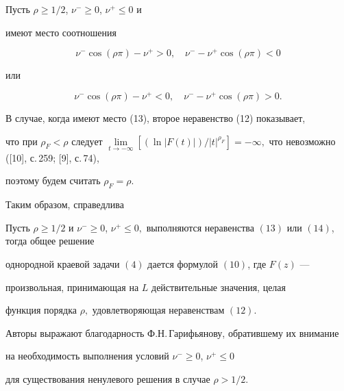 Пусть $\rho\geq 1/2$, $\nu^{-}\geq 0$, $\nu^{+}\leq 0$ и


имеют место соотношения


\begin{equation}


\nu^{-}\cos(\rho\pi)-\nu^{+} > 0,\quad \nu^{-}-\nu^{+}\cos(\rho\pi) < 0


\end{equation}


или


\begin{equation}


\nu^{-}\cos(\rho\pi)-\nu^{+} < 0,\quad\nu^{-}-\nu^{+}\cos(\rho\pi) > 0.


\end{equation}


В случае, когда имеют место (13), второе неравенство (12) показывает,


что при $\rho_{F} <\rho$ следует $\lim\limits_{t\to -\infty}[(\ln|F(t)|)


/|t|^{\rho_{F}}]=-\infty,$ что невозможно ([10], с.\,259; [9], с.\,74),


поэтому будем считать $\rho_{F}=\rho.$





Таким образом, справедлива





\begin{thm}


Пусть $\rho\geq 1/2$ и $\nu^{-}\geq 0$, $\nu^{+}


\leq 0,$ выполняются неравенства $(13)$ или $(14)$, тогда общее решение


однородной краевой задачи $(4)$ дается формулой $(10)$, где $F(z)$ ---


произвольная, принимающая на $L$ действительные значения, целая


функция порядка $\rho,$ удовлетворяющая неравенствам $(12)$.


\end{thm}





Авторы выражают благодарность Ф.Н.\,Гарифьянову, обратившему их внимание


на необходимость выполнения условий $\nu^{-}\geq 0$, $\nu^{+}\leq  0$


для существования ненулевого решения в случае $\rho > 1/2$.





